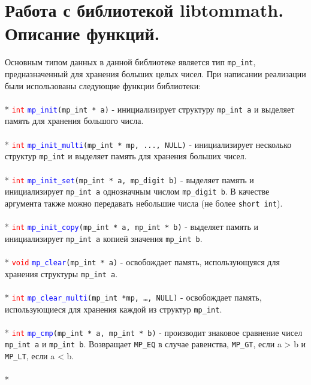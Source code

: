 \documentclass[12pt]{article}
\begin{document}
\section{Работа с библиотекой libtommath. Описание функций.}
Основным типом данных в данной библиотеке является тип \texttt{mp\_int}, предназначенный для хранения больших целых чисел. При написании реализации были использованы следующие функции библиотеки:\\
\\*
\textcolor{red}{\texttt{int}} \textcolor{blue}{\texttt{mp\_init}}\texttt{(mp\_int * a)} - инициализирует структуру \texttt{mp\_int а} и выделяет память для хранения большого числа.\\
\\*
\textcolor{red}{\texttt{int}} \textcolor{blue}{\texttt{mp\_init\_multi}}\texttt{(mp\_int * mp, ..., NULL)} - инициализирует несколько структур \texttt{mp\_int} и выделяет память для хранения больших чисел. \\
\\*
\textcolor{red}{\texttt{int}} \textcolor{blue}{\texttt{mp\_init\_set}}\texttt{(mp\_int * a, mp\_digit b)} - выделяет память и инициализирует \texttt{mp\_int a} однозначным числом \texttt{mp\_digit b}. В качестве аргумента также можно передавать небольшие числа (не более \texttt{short int}).\\
\\*
\textcolor{red}{\texttt{int}} \textcolor{blue}{\texttt{mp\_init\_copy}}\texttt{(mp\_int * a, mp\_int * b)} - выделяет память и инициализирует \texttt{mp\_int a} копией значения \texttt{mp\_int b}.\\
\\*
\textcolor{red}{\texttt{void}} \textcolor{blue}{\texttt{mp\_clear}}\texttt{(mp\_int * a)} - освобождает память, использующуяся для хранения структуры \texttt{mp\_int a}.\\
\\*
\textcolor{red}{\texttt{int}} \textcolor{blue}{\texttt{mp\_clear\_multi}}\texttt{(mp\_int *mp, \dots, NULL)} - освобождает память, использующиеся для хранения каждой из структур \texttt{mp\_int}.\\
\\*
\textcolor{red}{\texttt{int}} \textcolor{blue}{\texttt{mp\_cmp}}\texttt{(mp\_int * a, mp\_int * b)} - производит знаковое сравнение чисел \texttt{mp\_int a} и \texttt{mp\_int b}. Возвращает \texttt{MP\_EQ} в случае равенства, \texttt{MP\_GT}, если a > b и \texttt{MP\_LT}, если a < b. \\
\\*
\end{document}

